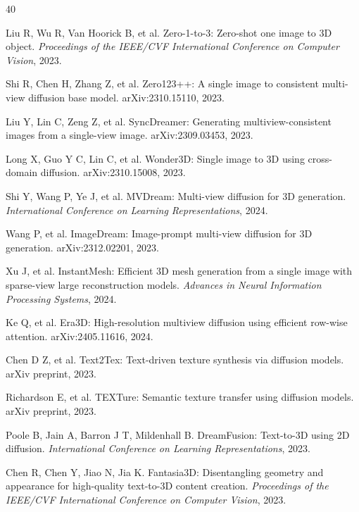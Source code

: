 \documentclass[times,twocolumn,final]{elsarticle}
\begin{document}
\begin{thebibliography}{40}


Liu R, Wu R, Van Hoorick B, et al. Zero-1-to-3: Zero-shot one image to 3D object. \textit{Proceedings of the IEEE/CVF International Conference on Computer Vision}, 2023.

Shi R, Chen H, Zhang Z, et al. Zero123++: A single image to consistent multi-view diffusion base model. arXiv:2310.15110, 2023.

Liu Y, Lin C, Zeng Z, et al. SyncDreamer: Generating multiview-consistent images from a single-view image. arXiv:2309.03453, 2023.

Long X, Guo Y C, Lin C, et al. Wonder3D: Single image to 3D using cross-domain diffusion. arXiv:2310.15008, 2023.

Shi Y, Wang P, Ye J, et al. MVDream: Multi-view diffusion for 3D generation. \textit{International Conference on Learning Representations}, 2024.

Wang P, et al. ImageDream: Image-prompt multi-view diffusion for 3D generation. arXiv:2312.02201, 2023.

Xu J, et al. InstantMesh: Efficient 3D mesh generation from a single image with sparse-view large reconstruction models. \textit{Advances in Neural Information Processing Systems}, 2024.

Ke Q, et al. Era3D: High-resolution multiview diffusion using efficient row-wise attention. arXiv:2405.11616, 2024.

Chen D Z, et al. Text2Tex: Text-driven texture synthesis via diffusion models. arXiv preprint, 2023.

Richardson E, et al. TEXTure: Semantic texture transfer using diffusion models. arXiv preprint, 2023.

Poole B, Jain A, Barron J T, Mildenhall B. DreamFusion: Text-to-3D using 2D diffusion. \textit{International Conference on Learning Representations}, 2023.

Chen R, Chen Y, Jiao N, Jia K. Fantasia3D: Disentangling geometry and appearance for high-quality text-to-3D content creation. \textit{Proceedings of the IEEE/CVF International Conference on Computer Vision}, 2023.


\end{thebibliography}
\end{document}
